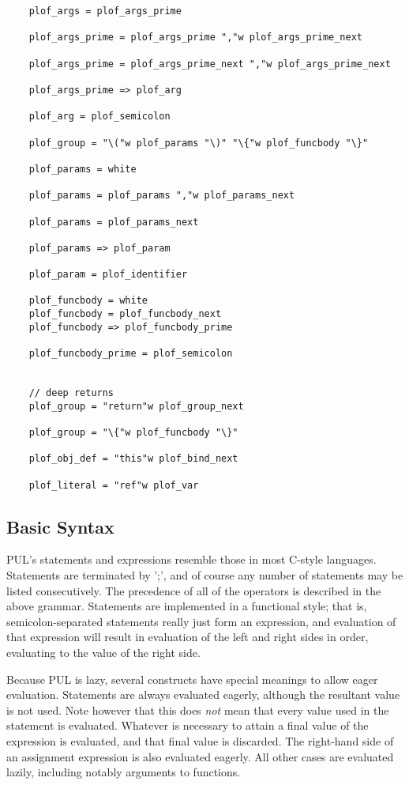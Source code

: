 \begin{verbatim}
    plof_args = plof_args_prime

    plof_args_prime = plof_args_prime ","w plof_args_prime_next

    plof_args_prime = plof_args_prime_next ","w plof_args_prime_next

    plof_args_prime => plof_arg

    plof_arg = plof_semicolon

    plof_group = "\("w plof_params "\)" "\{"w plof_funcbody "\}"
    
    plof_params = white

    plof_params = plof_params ","w plof_params_next

    plof_params = plof_params_next

    plof_params => plof_param

    plof_param = plof_identifier

    plof_funcbody = white
    plof_funcbody = plof_funcbody_next
    plof_funcbody => plof_funcbody_prime

    plof_funcbody_prime = plof_semicolon


    // deep returns
    plof_group = "return"w plof_group_next

    plof_group = "\{"w plof_funcbody "\}"

    plof_obj_def = "this"w plof_bind_next

    plof_literal = "ref"w plof_var
\end{verbatim}



\subsection{Basic Syntax}

PUL's statements and expressions resemble those in most C-style languages. Statements are terminated by ';', and of course any number of statements may be listed consecutively. The precedence of all of the operators is described in the above grammar. Statements are implemented in a functional style; that is, semicolon-separated statements really just form an expression, and evaluation of that expression will result in evaluation of the left and right sides in order, evaluating to the value of the right side.

Because PUL is lazy, several constructs have special meanings to allow eager evaluation. Statements are always evaluated eagerly, although the resultant value is not used. Note however that this does \textit{not} mean that every value used in the statement is evaluated. Whatever is necessary to attain a final value of the expression is evaluated, and that final value is discarded. The right-hand side of an assignment expression is also evaluated eagerly. All other cases are evaluated lazily, including notably arguments to functions.



